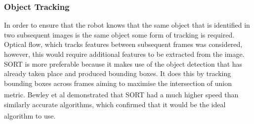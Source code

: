\documentclass[11pt]{article}		%
\newcommand{\supercite}[1]{\textsuperscript{\cite{#1}}}		%
\newcommand{\figref}[1]{\hyperref[#1]{Figure \ref*{#1}}}    %
\begin{document}
	        \subsubsection{Object Tracking}
			\begin{floatingfigure}[r]{0pt} \end{floatingfigure}
	        In order to ensure that the robot knows that the same object that is identified in two subsequent images is the same object some form of tracking is required. Optical flow, which tracks features between subsequent frames was considered, however, this would require additional features to be extracted from the image. SORT is more preferable because it makes use of the object detection that has already taken place and produced bounding boxes. It does this by tracking bounding boxes across frames aiming to maximise the intersection of union metric. Bewley et al\supercite{object_tracking} demonstrated that SORT had a much higher speed than similarly accurate algorithms, which confirmed that it would be the ideal algorithm to use\supercite{object_tracking}.
	        
			
\end{document}
